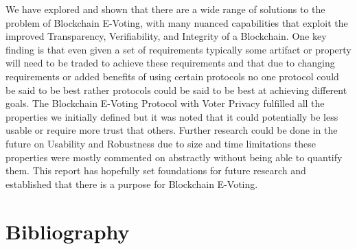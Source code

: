 \documentclass{llncs}
\begin{document}

We have explored and shown that there are a wide range of solutions to the problem of Blockchain E-Voting, with many nuanced capabilities that exploit the improved Transparency, Verifiability, and Integrity of a Blockchain. One key finding is that even given a set of requirements typically some artifact or property will need to be traded to achieve these requirements and that due to changing requirements or added benefits of using certain protocols no one protocol could be said to be best rather protocols could be said to be best at achieving different goals. The Blockchain E-Voting Protocol with Voter Privacy fulfilled all the properties we initially defined but it was noted that it could potentially be less usable or require more trust that others. Further research could be done in the future on Usability and Robustness due to size and time limitations these properties were mostly commented on abstractly without being able to quantify them. This report has hopefully set foundations for future research and established that there is a purpose for Blockchain E-Voting.



\section{Bibliography}
{}

\end{document}
